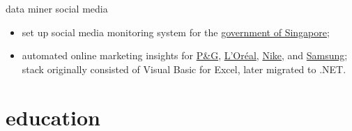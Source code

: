 \documentclass[]{friggeri-cv}
\begin{document}
\begin{entrylist}
    {data miner social media}
    {
      \begin{itemize}
        \item set up social media monitoring system for the \href{https://www.gov.sg/}{government of Singapore};
        \item automated online marketing insights for
        \href{https://www.pg.com/}{P\&G},
        \href{http://www.loreal.com/}{L'Oréal},
        \href{https://www.nike.com/}{Nike},
        and
        \href{http://samsung.com/}{Samsung};
        stack originally consisted of Visual Basic for Excel, later migrated to .NET.
      \end{itemize}
    }
\end{entrylist}

\section{education}
\end{document}
